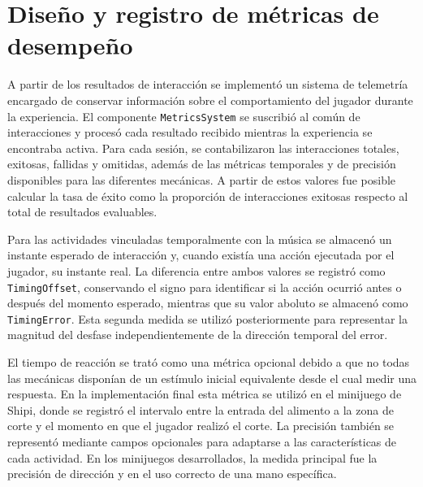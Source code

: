 \section{Diseño y registro de métricas de desempeño}
A partir de los resultados de interacción se implementó un sistema de
telemetría encargado de conservar información sobre el comportamiento del jugador
durante la experiencia. El componente \texttt{MetricsSystem} se suscribió
al común de interacciones y procesó cada resultado recibido mientras la
experiencia se encontraba activa. Para cada sesión, se contabilizaron las
interacciones totales, exitosas, fallidas y omitidas, además de las métricas
temporales y de precisión disponibles para las diferentes mecánicas. A
partir de estos valores fue posible calcular la tasa de éxito como la
proporción de interacciones exitosas respecto al total de resultados evaluables.

Para las actividades vinculadas temporalmente con la música se almacenó un
instante esperado de interacción y, cuando existía una acción ejecutada por el 
jugador, su instante real. La diferencia entre ambos valores se registró como 
\texttt{TimingOffset}, conservando el signo para identificar si la acción ocurrió
antes o después del momento esperado, mientras que su valor aboluto se almacenó
como \texttt{TimingError}. Esta segunda medida se utilizó posteriormente para representar
la magnitud del desfase independientemente de la dirección temporal del error.

El tiempo de reacción se trató como una métrica opcional debido a que no todas
las mecánicas disponían de un estímulo inicial equivalente desde el cual
medir una respuesta. En la implementación final esta métrica se utilizó en el minijuego
de Shipi, donde se registró el intervalo entre la entrada del alimento a la zona de corte
y el momento en que el jugador realizó el corte. La precisión también se representó mediante campos opcionales para adaptarse
a las características de cada actividad. En los minijuegos desarrollados, la medida
principal fue la precisión de dirección y en el uso correcto de una mano específica.

